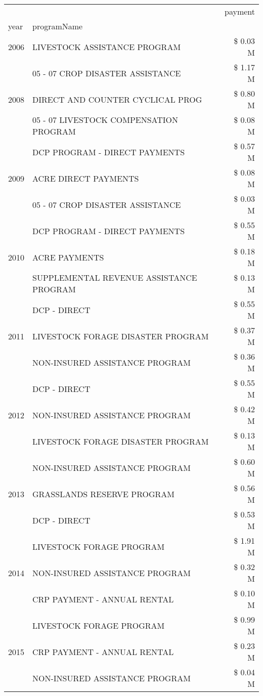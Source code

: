 \begin{tabular}{llr}
\toprule
 &  & payment \\
year & programName &  \\
\midrule
2006 & LIVESTOCK ASSISTANCE PROGRAM & \$ 0.03 M \\
\cline{1-3}
\multirow[t]{3}{*}{2008} & 05 - 07 CROP DISASTER ASSISTANCE & \$ 1.17 M \\
 & DIRECT AND COUNTER CYCLICAL PROG & \$ 0.80 M \\
 & 05 - 07 LIVESTOCK COMPENSATION PROGRAM & \$ 0.08 M \\
\cline{1-3}
\multirow[t]{3}{*}{2009} & DCP PROGRAM - DIRECT PAYMENTS & \$ 0.57 M \\
 & ACRE DIRECT PAYMENTS & \$ 0.08 M \\
 & 05 - 07 CROP DISASTER ASSISTANCE & \$ 0.03 M \\
\cline{1-3}
\multirow[t]{3}{*}{2010} & DCP PROGRAM - DIRECT PAYMENTS & \$ 0.55 M \\
 & ACRE PAYMENTS & \$ 0.18 M \\
 & SUPPLEMENTAL REVENUE ASSISTANCE PROGRAM & \$ 0.13 M \\
\cline{1-3}
\multirow[t]{3}{*}{2011} & DCP - DIRECT & \$ 0.55 M \\
 & LIVESTOCK FORAGE DISASTER PROGRAM & \$ 0.37 M \\
 & NON-INSURED ASSISTANCE PROGRAM & \$ 0.36 M \\
\cline{1-3}
\multirow[t]{3}{*}{2012} & DCP - DIRECT & \$ 0.55 M \\
 & NON-INSURED ASSISTANCE PROGRAM & \$ 0.42 M \\
 & LIVESTOCK FORAGE DISASTER PROGRAM & \$ 0.13 M \\
\cline{1-3}
\multirow[t]{3}{*}{2013} & NON-INSURED ASSISTANCE PROGRAM & \$ 0.60 M \\
 & GRASSLANDS RESERVE PROGRAM & \$ 0.56 M \\
 & DCP - DIRECT & \$ 0.53 M \\
\cline{1-3}
\multirow[t]{3}{*}{2014} & LIVESTOCK FORAGE PROGRAM & \$ 1.91 M \\
 & NON-INSURED ASSISTANCE PROGRAM & \$ 0.32 M \\
 & CRP PAYMENT - ANNUAL RENTAL & \$ 0.10 M \\
\cline{1-3}
\multirow[t]{3}{*}{2015} & LIVESTOCK FORAGE PROGRAM & \$ 0.99 M \\
 & CRP PAYMENT - ANNUAL RENTAL & \$ 0.23 M \\
 & NON-INSURED ASSISTANCE PROGRAM & \$ 0.04 M \\

\end{tabular}

